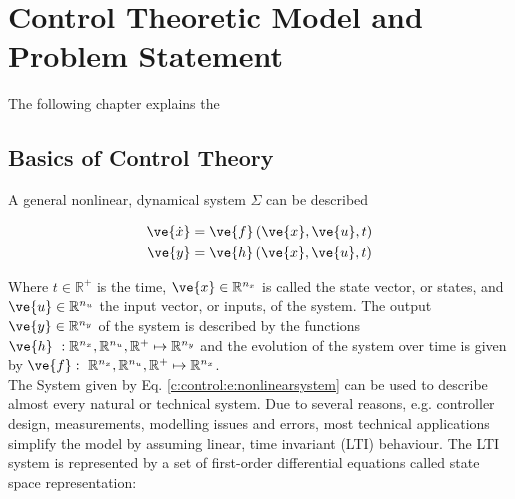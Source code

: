 \chapter{Control Theoretic Model and Problem Statement}\label{c:control}

The following chapter explains the 

\section{Basics of Control Theory}\label{c:control:s:basics}

A general nonlinear, dynamical system $\Sigma$ can be described \cite{Adamy2014}

\begin{align}
\begin{split}
\ve{\dot{x}} &= \ve{f}\left(\ve{x},\ve{u}, t\right) \\
\ve{y} &= \ve{h}\left(\ve{x},\ve{u},t \right)
\end{split}
\label{c:control:e:nonlinearsystem}
\end{align}


Where $t \in \mathbb{R}^+$ is the time, $\ve{x} \in \mathbb{R}^{n_x}$ is called the state vector, or states, and $\ve{u} \in \mathbb{R}^{n_u}$ the input vector, or inputs, of the system. The output $\ve{y} \in \mathbb{R}^{n_y}$ of the system is described by the functions$\ve{h}~:\mathbb{R}^{n_x},\mathbb{R}^{n_u},\mathbb{R}^+ \mapsto \mathbb{R}^{n_y}$ and the evolution of the system over time is given by $\ve{f}:~\mathbb{R}^{n_x},\mathbb{R}^{n_u},\mathbb{R}^+ \mapsto \mathbb{R}^{n_x} $.\\

The System given by Eq. \ref{c:control:e:nonlinearsystem} can be used to describe almost every natural or technical system.\newline
Due to several reasons, e.g. controller design, measurements, modelling issues and errors, most technical applications simplify the model by assuming linear, time invariant (LTI) behaviour. The LTI system is represented by a set of first-order differential equations \cite{Lunze2014} called state space representation:

